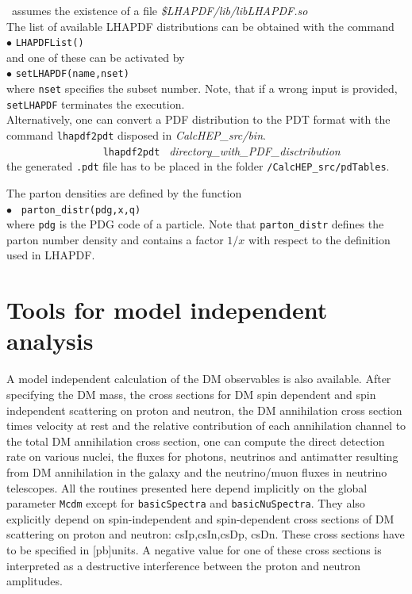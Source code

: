 \documentclass[12pt,a4paper]{article}
\begin{document}
\micro\ 
assumes the existence of a file {\it  \$LHAPDF/lib/libLHAPDF.so}\\
The list of available LHAPDF
distributions can be obtained with the command\\
$\bullet$ \verb|LHAPDFList()|\\
and one of these can be activated by \\
$\bullet$ \verb|setLHAPDF(name,nset)|\\
where {\tt nset} specifies the subset number. Note, that if a wrong input is provided, 
\verb|setLHAPDF| terminates the execution.\\[2mm]
%
Alternatively, one can convert a  PDF distribution to the PDT format with  the command {\tt  lhapdf2pdt} disposed in {\it CalcHEP\_src/bin}.\\
\verb|                 lhapdf2pdt | {\it directory\_with\_PDF\_disctribution} \\
the generated {\tt .pdt} file has to be placed in the folder {\tt /CalcHEP\_src/pdTables}.
   

The parton densities are  defined  by the function \\
$\bullet$ \verb| parton_distr(pdg,x,q)|\\
where {\tt pdg} is the PDG code of a particle. Note that \verb|parton_distr| defines the parton number density and  
contains a factor $1/x$  with respect to the  definition used in LHAPDF.  

 
\section{Tools for model independent analysis}
\label{mdlIndep}

A model independent calculation of the DM observables is also available.
After specifying the DM mass, the cross sections for DM  spin dependent and  spin independent scattering on proton and neutron, the DM annihilation cross section times velocity at rest and the relative contribution of  each annihilation channel to the total DM annihilation cross section, one can compute the direct detection rate on   various nuclei, the fluxes for photons, neutrinos and antimatter resulting from DM annihilation in the galaxy and the neutrino/muon fluxes in neutrino telescopes.  
All the routines presented here 
depend implicitly on the  global parameter {\tt Mcdm} except for {\tt basicSpectra} and {\tt basicNuSpectra}.
They also explicitly depend on spin-independent and spin-dependent cross sections of DM scattering
on proton and neutron: csIp,csIn,csDp, csDn. These cross sections have to be specified in
[pb]units. A negative value for one of these cross sections is interpreted as a destructive 
interference between the proton and neutron amplitudes. 
\end{document}
